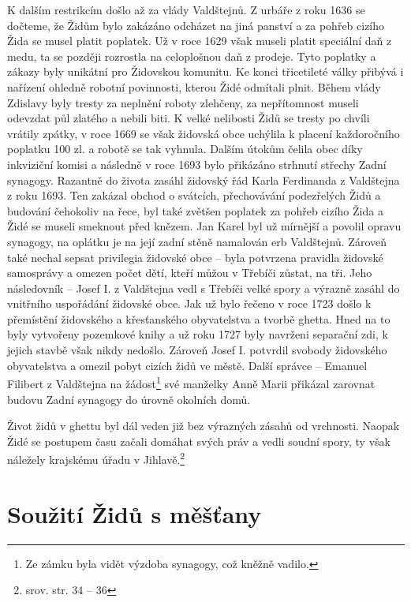 \documentclass[a4paper,oneside,12pt]{report}
\begin{document}
K dalším restrikcím došlo až za vlády Valdštejnů.
Z urbáře z roku 1636 se dočteme, že Židům bylo zakázáno odcházet na jiná panství a za pohřeb cizího Žida se musel platit poplatek.
Už v roce 1629 však museli platit speciální daň z medu, ta se později rozrostla na celoplošnou daň z prodeje.
Tyto poplatky a zákazy byly unikátní pro Židovskou komunitu.
Ke konci třicetileté války přibývá i nařízení ohledně robotní povinnosti, kterou Židé odmítali plnit.
Během vlády Zdislavy byly tresty za neplnění roboty zlehčeny, za nepřítomnost museli odevzdat půl zlatého a nebili biti.
K velké nelibosti Židů se tresty po chvíli vrátily zpátky, v roce 1669 se však židovská obce uchýlila k placení každoročního poplatku 100 zl. a robotě se tak vyhnula.
Dalším útokům čelila obec díky inkviziční komisi a následně v roce 1693 bylo přikázáno strhnutí střechy Zadní synagogy.
Razantně do života zasáhl židovský řád Karla Ferdinanda z Valdštejna z roku 1693.
Ten zakázal obchod o svátcích, přechovávání podezřelých Židů a budování čehokoliv na řece, byl také zvětšen poplatek za pohřeb cizího Žida a Židé se museli smeknout před knězem.
Jan Karel byl už mírnější a povolil opravu synagogy, na oplátku je na její zadní stěně namalován erb Valdštejnů.
Zároveň také nechal sepsat privilegia židovské obce -- byla potvrzena pravidla židovské samosprávy a omezen počet dětí, kteří můžou v Třebíči zůstat, na tři.
Jeho následovník -- Josef I. z Valdštejna vedl s Třebíči velké spory a výrazně zasáhl do vnitřního uspořádání židovské obce.
Jak už bylo řečeno v roce 1723 došlo k přemístění židovského a křesťanského obyvatelstva a tvorbě ghetta.
Hned na to byly vytvořeny pozemkové knihy a už roku 1727 byly navrženi separační zdi, k jejich stavbě však nikdy nedošlo.
Zároveň Josef I. potvrdil svobody židovského obyvatelstva a omezil pobyt cizích židů ve městě.
Další správce -- Emanuel Filibert z Valdštejna na žádost\footnote{Ze zámku byla vidět výzdoba synagogy, což kněžně vadilo.} své manželky Anně Marii přikázal zarovnat budovu Zadní synagogy do úrovně okolních domů.

Život židů v ghettu byl dál veden již bez výrazných zásahů od vrchnosti.
Naopak Židé se postupem času začali domáhat svých práv a vedli soudní spory, ty však náležely krajskému úřadu v Jihlavě.\footnote{srov. \cite{Fiser2005} str. 34 -- 36}

\section{Soužití Židů s měšťany}
\end{document}
